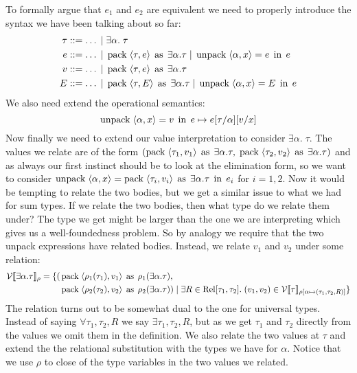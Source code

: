 To formally argue that $e_1$ and $e_2$ are equivalent we need to properly introduce the syntax we have been talking about so far:
\begin{align*}
  \tau & ::= \dots \; | \; \exists \alpha. \; \tau \\
  e & ::= \dots \; | \; \operatorname{pack} \; \langle \tau,e \rangle \; \operatorname{as} \; \exists \alpha. \tau \; | \; \operatorname{unpack} \; \langle \alpha,x \rangle = e \; \operatorname{in} \; e  \\
  v & ::= \dots \; | \; \operatorname{pack} \; \langle \tau,e \rangle \; \operatorname{as} \; \exists \alpha. \tau \\
  E & ::= \dots \; | \; \operatorname{pack} \; \langle \tau,E \rangle \; \operatorname{as} \; \exists \alpha. \tau \; | \; \operatorname{unpack} \; \langle \alpha,x \rangle = E \; \operatorname{in} \; e 
\end{align*}
We also need extend the operational semantics:
\[
\operatorname{unpack} \; \langle \alpha,x \rangle = v \; \operatorname{in} \; e  \mapsto e[\tau/\alpha][v/x]
\]
Now finally we need to extend our value interpretation to consider $\exists \alpha. \; \tau$. The values we relate are of the form $(\operatorname{pack} \; \langle \tau_1,v_1 \rangle \; \operatorname{as} \; \exists\alpha.\tau, \; \operatorname{pack} \; \langle \tau_2,v_2 \rangle \; \operatorname{as} \; \exists\alpha.\tau)$ and as always our first instinct should be to look at the elimination form, so we want to consider $\operatorname{unpack} \; \langle \alpha,x \rangle = \operatorname{pack} \; \langle \tau_i,v_i \rangle \; \operatorname{as} \; \exists\alpha.\tau \; \operatorname{in} \; e_i $ for $i=1,2$. Now it would be tempting to relate the two bodies, but we get a similar issue to what we had for sum types. If we relate the two bodies, then what type do we relate them under? The type we get might be larger than the one we are interpreting which gives us a well-foundedness problem. So by analogy we require that the two unpack expressions have related bodies. Instead, we relate $v_1$ and $v_2$ under some relation:
\begin{align*}
  \vprep{\exists\alpha.\tau} = \{(&\pack{\rho_1(\tau_1)}{v_1}{\rho_1(\exists\alpha.\tau)},\\
                                  &\pack{\rho_2(\tau_2)}{v_2}{\rho_2(\exists\alpha.\tau)}) \vbar \exists R \in \Rel[\tau_1,\tau_2].\; (v_1,v_2) \in \vprep[\extsub{\rho}{\alpha}{(\tau_1,\tau_2,R)}]{\tau}\} %
\end{align*}
The relation turns out to be somewhat dual to the one for universal types. Instead of saying $\forall \tau_1,\tau_2,R$ we say $\exists \tau_1,\tau_2,R$, but as we get $\tau_1$ and $\tau_2$ directly from the values we omit them in the definition. We also relate the two values at $\tau$ and extend the the relational substitution with the types we have for $\alpha$. Notice that we use $\rho$ to close of the type variables in the two values we related.


